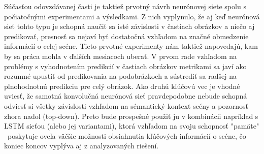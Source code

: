 Súčasťou odovzdávanej časti je taktiež prvotný návrh neurónovej siete spolu s počiatočnými experimentami a výsledkami. Z nich vyplynulo, že aj keď neurónová sieť tohto typu je schopná naučiť sa isté závislosti v častiach obrázkov a niečo aj predikovať, presnosť sa nejaví byť dostatočná vzhľadom na značné obmedzenie informácií o celej scéne. Tieto prvotné experimenty nám taktiež napovedajú, kam by sa práca mohla v ďalších mesiacoch uberať. V prvom rade vzhľadom na problémy s vyhodnotením predikcií v častiach obrázkov metrikami sa javí ako rozumné upustiť od predikovania na podobrázkoch a sústrediť sa radšej na plnohodnotnú predikciu pre celý obrázok. Ako druhú kľúčovú vec je vhodné uviesť, že samotná konvolučná neurónová sieť pravdepodobne nebude schopná odviesť si všetky závislosti vzhľadom na sémantický kontext scény a pozornosť zhora nadol (top-down). Preto bude prospešné použiť ju v kombinácii napríklad s LSTM sieťou (alebo jej variantami), ktorá vzhľadom na svoju schopnosť "pamäte" \ poskytuje oveľa väčšie možnosti obsiahnutia kľúčových informácií o scéne, čo koniec koncov vyplýva aj z analyzovaných riešení.
\fi
\newpage
\null
\thispagestyle{empty}
\newpage